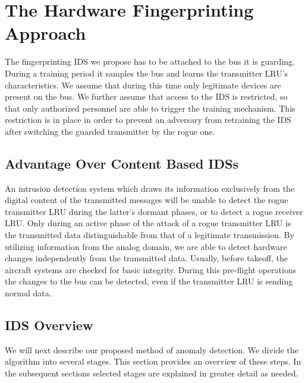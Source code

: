\documentclass[compsoc,conference,a4paper,10pt,times]{IEEEtran}
\newcommand{\level}[1]{\section{#1}}
\newcommand{\sublevel}[1]{\subsection{#1}}
\newcommand{\level}[1]{\chapter{#1}}
\newcommand{\sublevel}[1]{\section{#1}}
\begin{document}
\level{The Hardware Fingerprinting Approach} \label{Approach}
  The fingerprinting IDS we propose has to be attached to the bus it is guarding. During a training period it samples the bus and learns the transmitter LRU's characteristics. We assume that during this time only legitimate devices are present on the bus. We further assume that access to the IDS is restricted, so that only authorized personnel are able to trigger the training mechanism. This restriction is in place in order to prevent an adversary from retraining the IDS after switching the guarded transmitter by the rogue one.
  
\sublevel{Advantage Over Content Based IDSs}
  An intrusion detection system which draws its information exclusively from the digital content of the transmitted messages will be unable to detect the rogue transmitter LRU during the latter's dormant phases, or to detect a rogue receiver LRU. Only during an active phase of the attack of a rogue transmitter LRU is the transmitted data distinguishable from that of a legitimate transmission. By utilizing information from the analog domain, we are able to detect hardware changes independently from the transmitted data.  Usually, before takeoff, the aircraft systems are checked for basic integrity. During this pre-flight operations the changes to the bus can be detected, even if the transmitter LRU is sending normal data.
  
\sublevel{IDS Overview} \label{Overview}
  We will next describe our proposed method of anomaly detection. We divide the algorithm into several stages. This section provides an overview of these steps. In the subsequent sections selected stages are explained in greater detail as needed.
  
\end{document}
